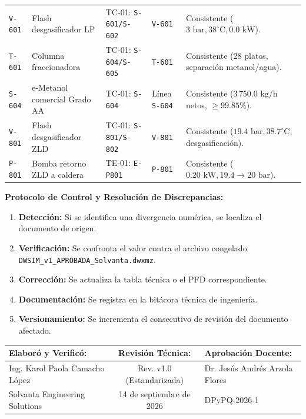\documentclass[11pt,letterpaper]{article}
\begin{document}
\begin{center}
\begin{tabularx}{\textwidth}{lp{3.5cm}p{3.0cm}p{2.5cm}X}
\texttt{V-601} & Flash desgasificador LP & TC-01: \texttt{S-601/S-602}& \texttt{V-601} & Consistente ($3\text{ bar}, 38^\circ\text{C}, 0.0\text{ kW}$). \\
\texttt{T-601} & Columna fraccionadora & TC-01: \texttt{S-604/S-605}& \texttt{T-601} & Consistente (28 platos, separación metanol/agua). \\
\texttt{S-604} & e-Metanol comercial Grado AA & TC-01: \texttt{S-604} & Línea \texttt{S-604} & Consistente ($3\,750.0\text{ kg/h}$ netos, $\ge 99.85\%$). \\
\texttt{V-801} & Flash desgasificador ZLD & TC-01: \texttt{S-801/S-802}& \texttt{V-801} & Consistente ($19.4\text{ bar}, 38.7^\circ\text{C}$, desgasificación). \\
\texttt{P-801} & Bomba retorno ZLD a caldera & TE-01: \texttt{E-P801} & \texttt{P-801} & Consistente ($0.20\text{ kW}, 19.4 \to 20\text{ bar}$). \\
\bottomrule
\end{tabularx}
\end{center}

\vspace{0.3cm}
\noindent\textbf{Protocolo de Control y Resolución de Discrepancias:}
\begin{enumerate}
    \item \textbf{Detección:} Si se identifica una divergencia numérica, se localiza el documento de origen.
    \item \textbf{Verificación:} Se confronta el valor contra el archivo congelado \texttt{DWSIM\_v1\_APROBADA\_Solvanta.dwxmz}.
    \item \textbf{Corrección:} Se actualiza la tabla técnica o el PFD correspondiente.
    \item \textbf{Documentación:} Se registra en la bitácora técnica de ingeniería.
    \item \textbf{Versionamiento:} Se incrementa el consecutivo de revisión del documento afectado.
\end{enumerate}

\vspace{0.5cm}
\begin{center}
\footnotesize
\begin{tabularx}{0.95\textwidth}{XcX}
\toprule
\textbf{Elaboró y Verificó:} & \textbf{Revisión Técnica:} & \textbf{Aprobación Docente:} \\
\midrule
Ing. Karol Paola Camacho López & Rev. v1.0 (Estandarizada) & Dr. Jesús Andrés Arzola Flores \\
Solvanta Engineering Solutions & 14 de septiembre de 2026 & DPyPQ-2026-1 \\
\bottomrule
\end{tabularx}
\end{center}
\end{document}
